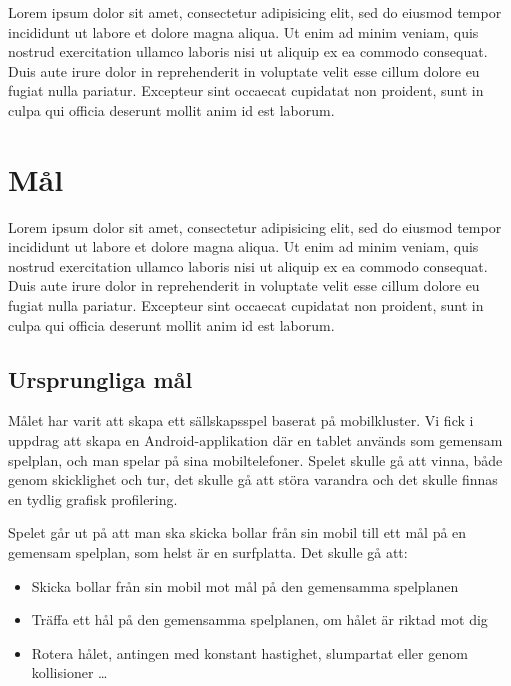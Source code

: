 \documentclass[a4paper,12pt,oneside,final]{extbook}
\begin{document}
Lorem ipsum dolor sit amet, consectetur adipisicing elit, sed do eiusmod tempor incididunt ut labore et dolore magna aliqua. Ut enim ad minim veniam, quis nostrud exercitation ullamco laboris nisi ut aliquip ex ea commodo consequat. Duis aute irure dolor in reprehenderit in voluptate velit esse cillum dolore eu fugiat nulla pariatur. Excepteur sint occaecat cupidatat non proident, sunt in culpa qui officia deserunt mollit anim id est laborum.

\section{Mål}

Lorem ipsum dolor sit amet, consectetur adipisicing elit, sed do eiusmod tempor incididunt ut labore et dolore magna aliqua. Ut enim ad minim veniam, quis nostrud exercitation ullamco laboris nisi ut aliquip ex ea commodo consequat. Duis aute irure dolor in reprehenderit in voluptate velit esse cillum dolore eu fugiat nulla pariatur. Excepteur sint occaecat cupidatat non proident, sunt in culpa qui officia deserunt mollit anim id est laborum.

\subsection{Ursprungliga mål}

Målet har varit att skapa ett sällskapsspel baserat på mobilkluster. Vi fick i uppdrag att skapa en Android-applikation där en tablet används som gemensam spelplan, och man spelar på sina mobiltelefoner. Spelet skulle gå att vinna, både genom skicklighet och tur, det skulle gå att störa varandra och det skulle finnas en tydlig grafisk profilering.

Spelet går ut på att man ska skicka bollar från sin mobil till ett mål på en gemensam spelplan, som helst är en surfplatta. Det skulle gå att:

\begin{itemize}

  \item Skicka bollar från sin mobil mot mål på den gemensamma spelplanen
  \item Träffa ett hål på den gemensamma spelplanen, om hålet är riktad mot dig
  \item Rotera hålet, antingen med konstant hastighet, slumpartat eller genom kollisioner \ldots

\end{itemize}
\end{document}
